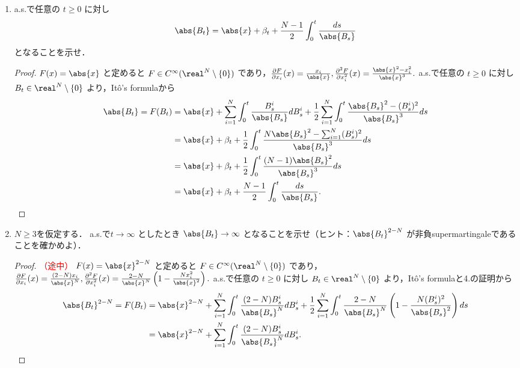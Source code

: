 \documentclass{jsarticle}
\begin{document}
\begin{enumerate}
    \item
    a.s.で任意の $t\ge0$ に対し
    $$
    \abs{B_t}
    = \abs{x}+\beta_t+\frac{N-1}{2}\int_0^t \frac{ds}{\abs{B_s}}
    $$
    となることを示せ．
    \begin{proof}
        $F(x)=\abs{x}$ と定めると $F\in C^\infty(\real^N\setminus\{0\})$ であり，$\frac{\partial F}{\partial x_i}(x)=\frac{x_i}{\abs{x}}, \frac{\partial^2 F}{\partial x_i^2}(x)=\frac{\abs{x}^2-x_i^2}{\abs{x}^3}.$
        a.s.で任意の $t\ge0$ に対し $B_t\in\real^N\setminus\{0\}$ より，It\^{o}'s formulaから
        \begin{align}
            \abs{B_t}
            = F(B_t)
            &= \abs{x}
            + \sum_{i=1}^{N}\int_0^t \frac{B_s^i}{\abs{B_s}}dB_s^i
            + \frac{1}{2}\sum_{i=1}^{N}\int_0^t \frac{\abs{B_s}^2-(B_s^i)^2}{\abs{B_s}^3}ds \\
            &= \abs{x}
            + \beta_t
            + \frac{1}{2}\int_0^t \frac{N\abs{B_s}^2-\sum_{i=1}^{N}(B_s^i)^2}{\abs{B_s}^3}ds \\
            &= \abs{x}
            + \beta_t
            + \frac{1}{2}\int_0^t \frac{(N-1)\abs{B_s}^2}{\abs{B_s}^3}ds \\
            &= \abs{x}
            + \beta_t
            + \frac{N-1}{2}\int_0^t \frac{ds}{\abs{B_s}}.
        \end{align}
    \end{proof}
    
    \item
    $N\ge3$を仮定する．
    a.s.で$t\to\infty$ としたとき $\abs{B_t}\to\infty$ となることを示せ（ヒント：$\abs{B_t}^{2-N}$ が非負supermartingaleであることを確かめよ）．
    \begin{proof}\textcolor{red}{（途中）}
        $F(x)=\abs{x}^{2-N}$ と定めると $F\in C^\infty(\real^N\setminus\{0\})$ であり，$\frac{\partial F}{\partial x_i}(x)=\frac{(2-N)x_i}{\abs{x}^N}, \frac{\partial^2 F}{\partial x_i^2}(x)=\frac{2-N}{\abs{x}^N}\left(1-\frac{Nx_i^2}{\abs{x}^2}\right).$
        a.s.で任意の $t\ge0$ に対し $B_t\in\real^N\setminus\{0\}$ より，It\^{o}'s formulaと4.の証明から
        \begin{align}
            \abs{B_t}^{2-N}
            = F(B_t)
            &= \abs{x}^{2-N}
            + \sum_{i=1}^{N}\int_0^t \frac{(2-N)B_s^i}{\abs{B_s}^N}dB_s^i
            + \frac{1}{2}\sum_{i=1}^{N}\int_0^t \frac{2-N}{\abs{B_s}^N}\left(1-\frac{N(B_s^i)^2}{\abs{B_s}^2}\right)ds \\
            &= \abs{x}^{2-N}
            + \sum_{i=1}^{N}\int_0^t \frac{(2-N)B_s^i}{\abs{B_s}^N}dB_s^i.
        \end{align}


\end{proof}
\end{enumerate}
\end{document}
